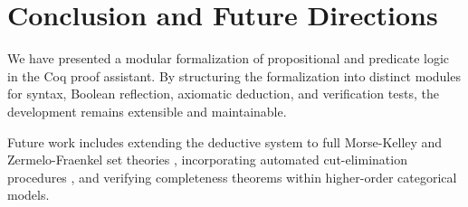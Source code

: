 \section{Conclusion and Future Directions}
\label{sec:conclusion}

We have presented a modular formalization of propositional and predicate logic in the Coq proof assistant. By structuring the formalization into distinct modules for syntax, Boolean reflection, axiomatic deduction, and verification tests, the development remains extensible and maintainable.

Future work includes extending the deductive system to full Morse-Kelley and Zermelo-Fraenkel set theories \cite{jech1978settheory, werner1997zfc}, incorporating automated cut-elimination procedures \cite{girard1972thesis}, and verifying completeness theorems within higher-order categorical models.
